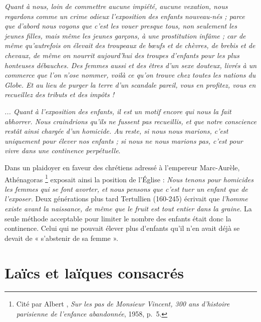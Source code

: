 \begin{displayquote}
\emph{Quant à nous, loin de commettre aucune impiété, aucune vexation, nous regardons comme un crime odieux l'exposition des enfants nouveau-nés ; parce que d'abord nous voyons que c'est les vouer presque tous, non seulement les jeunes filles, mais même les jeunes garçons, à une prostitution infâme ; car de même qu'autrefois on élevait des troupeaux de bœufs et de chèvres, de brebis et de chevaux, de même on nourrit aujourd'hui des troupes d'enfants pour les plus honteuses débauches. Des femmes aussi et des êtres d'un sexe douteux, livrés à un commerce que l'on n'ose nommer, voilà ce qu'on trouve chez toutes les nations du Globe. Et au lieu de purger la terre d'un scandale pareil, vous en profitez, vous en recueillez des tributs et des impôts !}

 \emph{... Quant à l'exposition des enfants, il est un motif encore qui nous la fait abhorrer. Nous craindrions qu'ils ne fussent pas recueillis, et que notre conscience restât ainsi chargée d'un homicide. Au reste, si nous nous marions, c'est uniquement pour élever nos enfants ; si nous ne nous marions pas, c'est pour vivre dans une continence perpétuelle}.
\end{displayquote}

 Dans un plaidoyer en faveur des chrétiens adressé à l'empereur Marc-Aurèle, Athénagoras%
\footnote{Cité par Albert , \emph{Sur les pas de Monsieur Vincent, 300 ans d'histoire parisienne de l'enfance abandonnée}, 1958, p.~5.}
exposait ainsi la position de l'Église : \emph{Nous tenons pour homicides les femmes qui se font avorter, et nous pensons que c'est tuer un enfant que de l'exposer.}  Deux générations plus tard Tertullien (160-245) écrivait que \emph{l'homme existe avant la naissance, de même que le fruit est tout entier dans la graine}. La seule méthode acceptable pour limiter le nombre des enfants était donc la continence. Celui qui ne pouvait élever plus d'enfants qu'il n'en avait déjà se devait de « s'abstenir de sa femme ».
 


 






\section{Laïcs et laïques consacrés}

